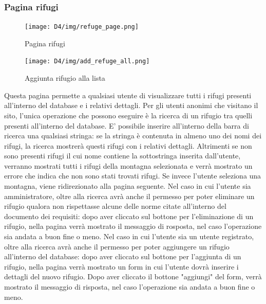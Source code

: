 \documentclass[a4paper,12pt]{article}
\begin{document}
\subsubsection{Pagina rifugi}
\begin{figure}[H]
    \centering    \texttt{[image: D4/img/refuge\_page.png]}
    \caption{Pagina rifugi}
\end{figure}
\begin{figure}[H]
    \centering    \texttt{[image: D4/img/add\_refuge\_all.png]}
    \caption{Aggiunta rifugio alla lista}
\end{figure}
Questa pagina permette a qualsiasi utente di visualizzare tutti i rifugi presenti all'interno del database e i relativi dettagli. \newline
Per gli utenti anonimi che visitano il sito, l'unica operazione che possono eseguire è la ricerca di un rifugio tra quelli presenti all'interno del database. \newline
E' possibile inserire all'interno della barra di ricerca una qualsiasi stringa: se la stringa è contenuta in almeno uno dei nomi dei rifugi, la ricerca mostrerà questi rifugi con i relativi dettagli. \newline
Altrimenti se non sono presenti rifugi il cui nome contiene la sottostringa inserita dall'utente, verranno mostrati tutti i rifugi della montagna selezionata e verrà mostrato un errore che indica che non sono stati trovati rifugi. \newline
Se invece l'utente seleziona una montagna, viene ridirezionato alla pagina seguente.
Nel caso in cui l'utente sia amministratore, oltre alla ricerca avrà anche il permesso per poter eliminare un rifugio qualora non rispettasse alcune delle norme citate all'interno del documento dei requisiti: dopo aver cliccato sul bottone per l'eliminazione di un rifugio, nella pagina verrà mostrato il messaggio di rosposta, nel caso l'operazione sia andata a buon fine o meno. \newline
Nel caso in cui l'utente sia un utente registrato, oltre alla ricerca avrà anche il permesso per poter aggiungere un rifugio all'interno del database: dopo aver cliccato sul bottone per l'aggiunta di un rifugio, nella pagina verrà mostrato un form in cui l'utente dovrà inserire i dettagli del nuovo rifugio. \newline
Dopo  aver cliccato il bottone "aggiungi" del form, verrà mostrato il messaggio di risposta, nel caso l'operazione sia andata a buon fine o meno.

\newpage
\end{document}
